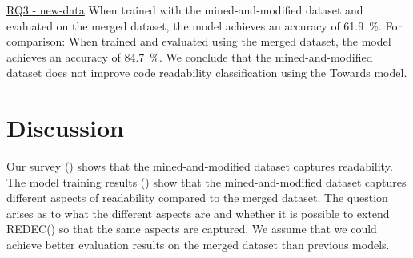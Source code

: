 \documentclass[%
class=scrreprt,
chapterprefix=false,%
open=right,%
twoside=true,%
paper=a4,%
logofile={Logo\_zentral\_farbig\_EN.png},%
thesistype=master,%
UKenglish,%
]{se2thesis}
\theoremstyle{definition}
\newcommand{\rdh}{REDEC\xspace}
\begin{document}
	\begin{summary}{\hyperref[new-data]{RQ3 - new-data}}
		When trained with the mined-and-modified dataset and evaluated on the merged dataset, the model achieves an accuracy of 61.9~\%. For comparison: When trained and evaluated using the merged dataset, the model achieves an accuracy of 84.7~\%.
		We conclude that the mined-and-modified dataset does not improve code readability classification using the Towards model.
	\end{summary}
	
	
\chapter{Discussion} \label{Discussion}


	Our survey () shows that the mined-and-modified dataset captures readability. The model training results () show that the mined-and-modified dataset captures different aspects of readability compared to the merged dataset. 	
	The question arises as to what the different aspects are and whether it is possible to extend \rdh () so that the same aspects are captured. We assume that we could achieve better evaluation results on the merged dataset than previous models.
	
\end{document}
